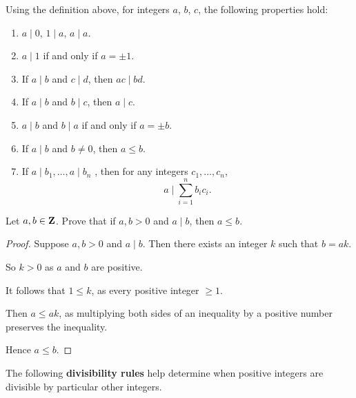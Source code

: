 \begin{proposition}
Using the definition above, for integers $a$, $b$, $c$, the following properties hold:
\begin{enumerate}[label=(\roman*)]
\item $a \mid 0$, $1\mid a$, $a \mid a$.
\item $a \mid 1$ if and only if $a = \pm 1$.
\item If $a \mid b$ and $c \mid d$, then $ac \mid bd$.
\item If $a \mid b$ and $b \mid c$, then $a \mid c$.
\item $a \mid b$ and $b \mid a$ if and only if $a = \pm b$.
\item If $a \mid b$ and $b \neq 0$, then $a \le b$.
\item If $a\mid b_1,\dots,a\mid b_n$ , then for any integers $c_1,\dots,c_n$, 
\[a\mid\sum_{i=1}^n b_ic_i.\]
\end{enumerate}
\end{proposition}

\begin{exercise}
Let $a,b\in\mathbf Z$. Prove that if $a,b>0$ and $a\mid b$, then $a\le b$. 
\end{exercise}

\begin{proof}
Suppose $a,b>0$ and $a\mid b$. Then there exists an integer $k$ such that $b=ak$.

So $k>0$ as $a$ and $b$ are positive.

It follows that $1\le k$, as every positive integer $\ge 1$.

Then $a\le ak$, as multiplying both sides of an inequality by a positive number preserves the inequality.

Hence $a\le b$.
\end{proof}

The following \textbf{divisibility rules} help determine when positive integers are divisible by particular other integers.

